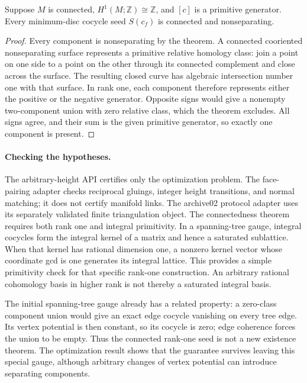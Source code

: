 \begin{corollary}
Suppose $M$ is connected, $H^1(M;\mathbb Z)\cong\mathbb Z$, and $[c]$ is a
primitive generator. Every minimum-disc cocycle seed $S(c_f)$ is connected
and nonseparating.
\end{corollary}

\begin{proof}
Every component is nonseparating by the theorem. A connected cooriented
nonseparating surface represents a primitive relative homology class:
join a point on one side to a point on the other through its connected
complement and close across the surface. The resulting closed curve
has algebraic intersection number one with that surface. In rank one,
each component therefore represents either the positive or the negative
generator. Opposite signs would give a nonempty two-component union
with zero relative class, which the theorem excludes. All signs agree,
and their sum is the given primitive generator, so exactly one component
is present.
\end{proof}

\paragraph{Checking the hypotheses.}
The arbitrary-height API certifies only the optimization problem.
The face-pairing adapter checks reciprocal gluings, integer height
transitions, and normal matching; it does not certify manifold links.
The archive02 protocol adapter uses its separately validated finite
triangulation object. The connectedness theorem requires both rank one and
integral primitivity. In a spanning-tree gauge, integral cocycles form
the integral kernel of a matrix and hence a saturated sublattice. When
that kernel has rational dimension one, a nonzero kernel vector whose
coordinate gcd is one generates its integral lattice. This provides a
simple primitivity check for that specific rank-one construction.
An arbitrary rational cohomology basis in higher rank is not thereby a
saturated integral basis.

The initial spanning-tree gauge already has a related property: a
zero-class component union would give an exact edge cocycle vanishing on
every tree edge. Its vertex potential is then constant, so its cocycle
is zero; edge coherence forces the union to be empty. Thus the connected
rank-one seed is not a new existence theorem. The optimization result
shows that the guarantee survives leaving this special gauge, although
arbitrary changes of vertex potential can introduce separating components.

